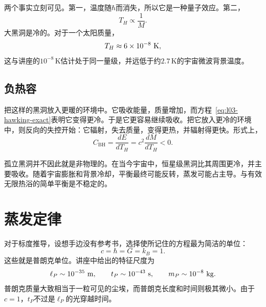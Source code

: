 两个事实立刻可见。第一，温度随\(\hbar\)而消失，所以它是一种量子效应。第二，
\begin{equation}
T_H\propto\frac{1}{M}.
\end{equation}
大黑洞是冷的。对于一个太阳质量，
\begin{equation}
T_H\approx6\times10^{-8}\ {\rm K},
\end{equation}
这与讲座的\(10^{-8}\,\mathrm{K}\)估计处于同一量级，并远低于约\(2.7\,\mathrm{K}\)的宇宙微波背景温度。

\subsection{负热容}

把这样的黑洞放入更暖的环境中。它吸收能量，质量增加，而方程~\eqref{eq:l03-hawking-exact}表明它变得更冷。于是它更容易继续吸收。把它放入更冷的环境中，则反向的失控开始：它辐射，失去质量，变得更热，并辐射得更快。形式上，
\begin{equation}
C_{\mathrm{BH}}
=\frac{dE}{dT_H}
=c^2\frac{dM}{dT_H}
<0.
\end{equation}

\begin{classroomqa}
\end{classroomqa}

孤立黑洞并不因此就是非物理的。在当今宇宙中，恒星级黑洞比其周围更冷，并主要吸收。随着宇宙膨胀和背景冷却，平衡最终可能反转，蒸发可能占主导。与有效无限热浴的简单平衡是不稳定的。

\section{蒸发定律}

对于标度推导，设想手边没有参考书，选择使所记住的方程最为简洁的单位：
\begin{equation}
c=\hbar=G=k_B=1.
\end{equation}
这些就是普朗克单位。讲座中给出的特征尺度为
\begin{equation}
\ell_P\sim10^{-35}\ {\rm m},
\qquad
t_P\sim10^{-43}\ {\rm s},
\qquad
m_P\sim10^{-8}\ {\rm kg}.
\end{equation}
普朗克质量大致相当于一粒可见的尘埃，而普朗克长度和时间则极其微小。由于\(c=1\)，\(t_P\)不过是\(\ell_P\)的光穿越时间。

